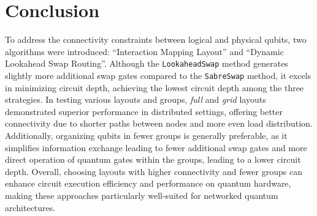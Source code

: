 \chapter{Conclusion} \label{Chap6} %
To address the connectivity constraints between logical and physical qubits, two algorithms were introduced: ``Interaction Mapping Layout'' and ``Dynamic Lookahead Swap Routing''. Although the \lstinline{LookaheadSwap} method generates slightly more additional swap gates compared to the \lstinline{SabreSwap} method, it excels in minimizing circuit depth, achieving the lowest circuit depth among the three strategies. In testing various layouts and groups, \textit{full} and \textit{grid} layouts demonstrated superior performance in distributed settings, offering better connectivity due to shorter paths between nodes and more even load distribution. Additionally, organizing qubits in fewer groups is generally preferable, as it simplifies information exchange leading to fewer additional swap gates and more direct operation of quantum gates within the groups, leading to a lower circuit depth. Overall, choosing layouts with higher connectivity and fewer groups can enhance circuit execution efficiency and performance on quantum hardware, making these approaches particularly well-suited for networked quantum architectures.